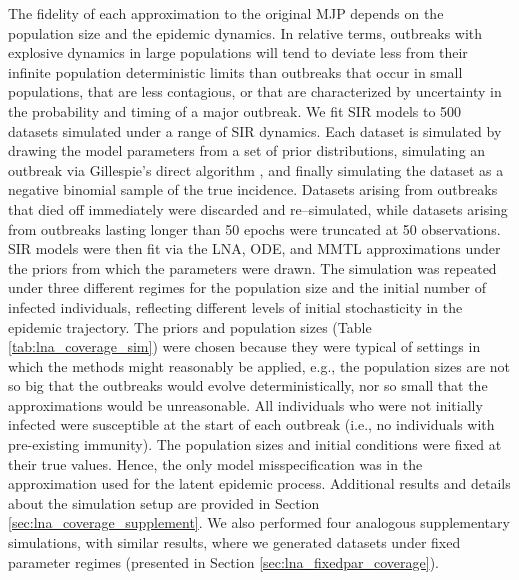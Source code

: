 The fidelity of each approximation to the original MJP depends on the population size and the epidemic dynamics. In relative terms, outbreaks with explosive dynamics in large populations will tend to deviate less from their infinite population deterministic limits than outbreaks that occur in small populations, that are less contagious, or that are characterized by uncertainty in the probability and timing of a major outbreak. We fit SIR models to 500 datasets simulated under a range of SIR dynamics. Each dataset is simulated by drawing the model parameters from a set of prior distributions, simulating an outbreak via Gillespie's direct algorithm \cite{gillespie1976general}, and finally simulating the dataset as a negative binomial sample of the true incidence. Datasets arising from outbreaks that died off immediately were discarded and re--simulated, while datasets arising from outbreaks lasting longer than 50 epochs were truncated at 50 observations. SIR models were then fit via the LNA, ODE, and MMTL approximations under the priors from which the parameters were drawn. The simulation was repeated under three different regimes for the population size and the initial number of infected individuals, reflecting different levels of initial stochasticity in the epidemic trajectory. The priors and population sizes (Table \ref{tab:lna_coverage_sim}) were chosen because they were typical of settings in which the methods might reasonably be applied, e.g., the population sizes are not so big that the outbreaks would evolve deterministically, nor so small that the approximations would be unreasonable. All individuals who were not initially infected were susceptible at the start of each outbreak (i.e., no individuals with pre-existing immunity).  The population sizes and initial conditions were fixed at their true values. Hence, the only model misspecification was in the approximation used for the latent epidemic process. Additional results and details about the simulation setup are provided in Section \ref{sec:lna_coverage_supplement}. We also performed four analogous supplementary simulations, with similar results, where we generated datasets under fixed parameter regimes (presented in Section \ref{sec:lna_fixedpar_coverage}).

